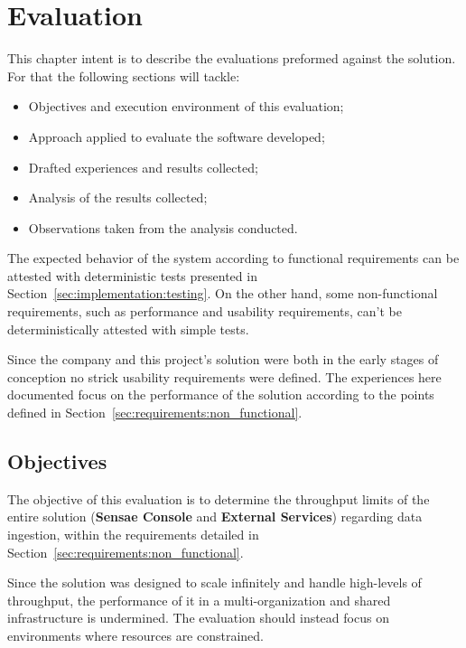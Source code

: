 \chapter{Evaluation}
\label{chap:evaluation}

This chapter intent is to describe the evaluations preformed against the solution. For that the following sections will tackle:

\begin{itemize}
    \item Objectives and execution environment of this evaluation;
    \item Approach applied to evaluate the software developed;
    \item Drafted experiences and results collected;
    \item Analysis of the results collected;
    \item Observations taken from the analysis conducted.
\end{itemize}

The expected behavior of the system according to functional requirements can be attested with deterministic tests presented in Section~\ref{sec:implementation:testing}. On the other hand, some non-functional requirements, such as performance and usability requirements, can't be deterministically attested with simple tests.

Since the company and this project's solution were both in the early stages of conception no strick usability requirements were defined. The experiences here documented focus on the performance of the solution according to the points defined in Section~\ref{sec:requirements:non_functional}.

\section{Objectives}
\label{sec:evaluation:objectives}

The objective of this evaluation is to determine the throughput limits of the entire solution (\textbf{Sensae Console} and \textbf{External Services}) regarding data ingestion, within the requirements detailed in Section~\ref{sec:requirements:non_functional}.

Since the solution was designed to scale infinitely and handle high-levels of throughput, the performance of it in a multi-organization and shared infrastructure is undermined. The evaluation should instead focus on environments where resources are constrained.

